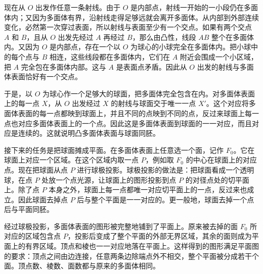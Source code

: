 \documentclass[12pt,UTF8,fontset=none]{ctexbook}
\begin{document}

现在从 $O$ 出发作任意一条射线。由于 $O$ 是内部点，射线一开始的一小段仍在多面体内；又因为多面体有界，沿射线走得足够远就会离开多面体。从内部到外部连续变化，必然第一次穿过表面，所以射线与表面至少有一个交点。如果有两个交点 $A$ 和 $B$，且从 $O$ 出发先经过 $A$ 再经过 $B$，那么由凸性，线段 $AB$ 整个在多面体内。又因为 $O$ 是内部点，存在一个以 $O$ 为球心的小球完全在多面体内。把小球中的每个点与 $B$ 相连，这些线段都在多面体内，它们在 $A$ 附近会围成一个小区域，把 $A$ 完全包在多面体内部。这与 $A$ 是表面点矛盾。因此从 $O$ 出发的射线与多面体表面恰好有一个交点。

于是，以 $O$ 为球心作一个足够大的球面，把多面体完全包含在内。对多面体表面上的每一点 $X$，从 $O$ 出发经过 $X$ 的射线与球面交于唯一一点 $X'$。这个对应将多面体表面的每一点都映到球面上，并且不同的点映到不同的点，反过来球面上每一点也对应多面体表面上的一个点。因此这是多面体表面到球面的一一对应，而且对应是连续的。这就说明凸多面体表面与球面同胚。


接下来的任务是把球面摊成平面。在多面体表面上任意选一个面，记作 $F_0$。它在球面上对应一个区域。在这个区域内取一点 $P$，例如取 $F_0$ 的中心在球面上的对应点。现在把球面从点 $P$ 进行球极投影。球极投影的做法是：把球面看成一个透明球，在点 $P$ 处放一个点光源，让球面上的图形投影到点 $P$ 的对径点处的切平面上。除了点 $P$ 本身之外，球面上每一点都唯一对应切平面上的一点，反过来也成立。因此球面去掉点 $P$ 后与整个平面是一一对应的。更一般地，球面去掉一个点后与平面同胚。


经过球极投影，多面体表面的图形被完整地铺到了平面上。原来被去掉的面 $F_0$ 所对应的区域包含点 $P$，投影后变成了整个平面的外部无界区域，其余的面则成为平面上的有界区域。顶点和棱也一一对应地落在平面上。这样得到的图形满足平面图的要求：顶点之间由边连接，任意两条边除端点外不相交，整个平面被分成若干个面。顶点数、棱数、面数都与原来的多面体相同。
\end{document}
